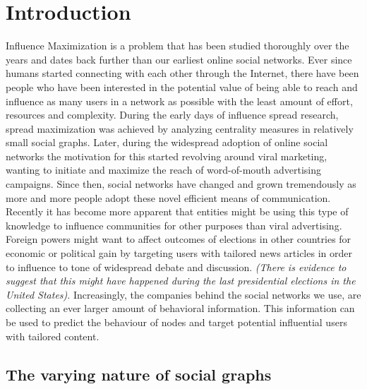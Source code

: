 \documentclass{acm_proc_article-sp}
\begin{document}



\section{Introduction}
Influence Maximization is a problem that has been studied thoroughly over the years and dates back further than our earliest online social networks. Ever since humans started connecting with each other through the Internet, there have been people who have been interested in the potential value of being able to reach and influence as many users in a network as possible with the least amount of effort, resources and complexity. During the early days of influence spread research, spread maximization was achieved by analyzing centrality measures in relatively small social graphs. Later, during the widespread adoption of online social networks the motivation for this started revolving around viral marketing, wanting to initiate and maximize the reach of word-of-mouth advertising campaigns. Since then, social networks have changed and grown tremendously as more and more people adopt these novel efficient means of communication. Recently it has become more apparent that entities might be using this type of knowledge to influence communities for other purposes than viral advertising. Foreign powers might want to affect outcomes of elections in other countries for economic or political gain by targeting users with tailored news articles in order to influence to tone of widespread debate and discussion. \textit{(There is evidence to suggest that this might have happened during the last presidential elections in the United States)}. Increasingly, the companies behind the social networks we use, are collecting an ever larger amount of behavioral information. This information can be used to predict the behaviour of nodes and target potential influential users with tailored content.

\subsection{The varying nature of social graphs}
\end{document}
